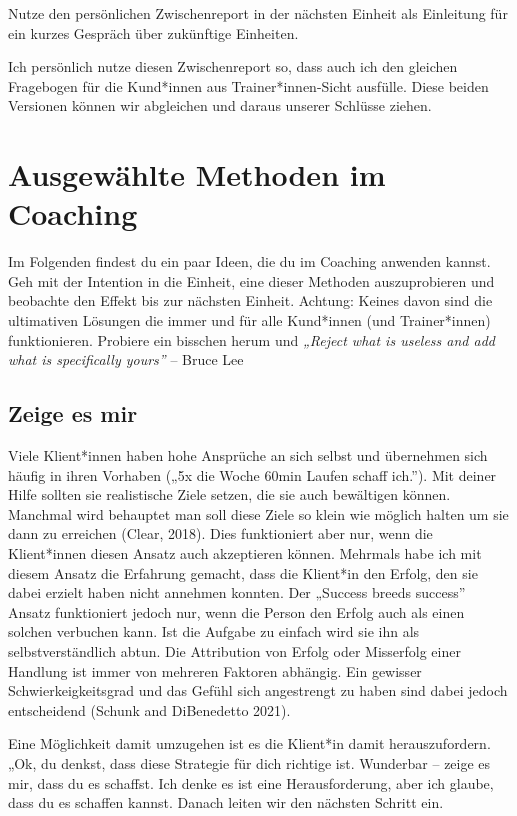 \documentclass[
  letterpaper,
  DIV=11,
  numbers=noendperiod]{scrreprt}
\begin{document}
Nutze den persönlichen Zwischenreport in der nächsten Einheit als
Einleitung für ein kurzes Gespräch über zukünftige Einheiten.

Ich persönlich nutze diesen Zwischenreport so, dass auch ich den
gleichen Fragebogen für die Kund*innen aus Trainer*innen-Sicht ausfülle.
Diese beiden Versionen können wir abgleichen und daraus unserer Schlüsse
ziehen.


\chapter{Ausgewählte Methoden im
Coaching}\label{ausgewuxe4hlte-methoden-im-coaching}

Im Folgenden findest du ein paar Ideen, die du im Coaching anwenden
kannst. Geh mit der Intention in die Einheit, eine dieser Methoden
auszuprobieren und beobachte den Effekt bis zur nächsten Einheit.
Achtung: Keines davon sind die ultimativen Lösungen die immer und für
alle Kund*innen (und Trainer*innen) funktionieren. Probiere ein bisschen
herum und \emph{„Reject what is useless and add what is specifically
yours''} -- Bruce Lee

\section{Zeige es mir}\label{zeige-es-mir}

Viele Klient*innen haben hohe Ansprüche an sich selbst und übernehmen
sich häufig in ihren Vorhaben („5x die Woche 60min Laufen schaff
ich.''). Mit deiner Hilfe sollten sie realistische Ziele setzen, die sie
auch bewältigen können. Manchmal wird behauptet man soll diese Ziele so
klein wie möglich halten um sie dann zu erreichen (Clear, 2018). Dies
funktioniert aber nur, wenn die Klient*innen diesen Ansatz auch
akzeptieren können. Mehrmals habe ich mit diesem Ansatz die Erfahrung
gemacht, dass die Klient*in den Erfolg, den sie dabei erzielt haben
nicht annehmen konnten. Der „Success breeds success'' Ansatz
funktioniert jedoch nur, wenn die Person den Erfolg auch als einen
solchen verbuchen kann. Ist die Aufgabe zu einfach wird sie ihn als
selbstverständlich abtun. Die Attribution von Erfolg oder Misserfolg
einer Handlung ist immer von mehreren Faktoren abhängig. Ein gewisser
Schwierkeigkeitsgrad und das Gefühl sich angestrengt zu haben sind dabei
jedoch entscheidend (Schunk and DiBenedetto 2021).

Eine Möglichkeit damit umzugehen ist es die Klient*in damit
herauszufordern. „Ok, du denkst, dass diese Strategie für dich richtige
ist. Wunderbar -- zeige es mir, dass du es schaffst. Ich denke es ist
eine Herausforderung, aber ich glaube, dass du es schaffen kannst.
Danach leiten wir den nächsten Schritt ein.
\end{document}
